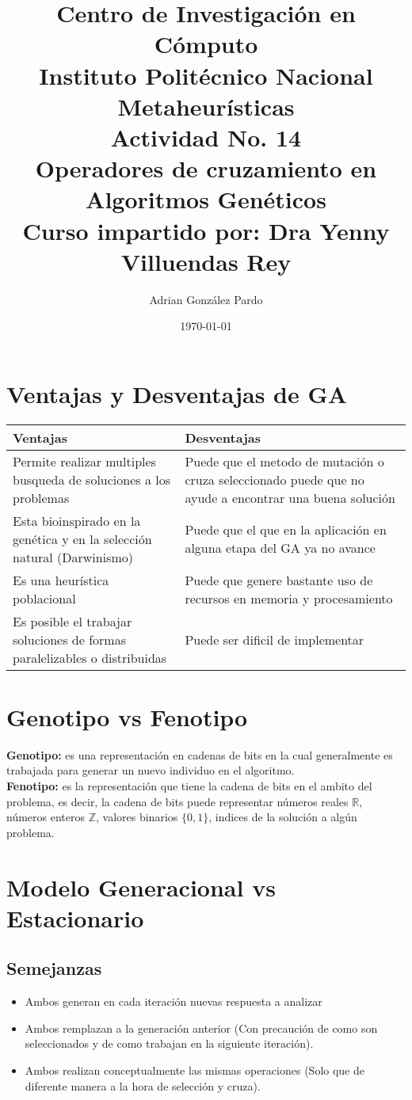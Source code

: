 \documentclass[10pt]{article}
\title{Centro de Investigación en Cómputo\\Instituto Politécnico Nacional\\Metaheurísticas\\Actividad No. 14\\ Operadores de cruzamiento en Algoritmos Genéticos\\Curso impartido por: Dra Yenny Villuendas Rey}
\author{Adrian González Pardo}
\date{\today}
\begin{document}
\maketitle
\section{Ventajas y Desventajas de GA}
\begin{center}
  \begin{tabular}{|p{6cm}|p{6cm}|}
    \hline
    Ventajas & Desventajas \\
    \hline
    Permite realizar multiples busqueda de soluciones a los problemas & Puede que el metodo de mutación o cruza seleccionado puede que no ayude a encontrar una buena solución\\
    \hline
    Esta bioinspirado en la genética y en la selección natural (Darwinismo) & Puede que el que en la aplicación en alguna etapa del GA ya no avance \\
    \hline
    Es una heurística poblacional & Puede que genere bastante uso de recursos en memoria y procesamiento \\
    \hline
    Es posible el trabajar soluciones de formas paralelizables o distribuidas&Puede ser dificil de implementar\\
    \hline
  \end{tabular}
\end{center}
\section{Genotipo vs Fenotipo}
\textbf{Genotipo:} es una representación en cadenas de bits en la cual generalmente es trabajada para generar un nuevo individuo en el algoritmo.
\\
\textbf{Fenotipo:} es la representación que tiene la cadena de bits en el ambito del problema, es decir, la cadena de bits puede representar números reales $\mathbb{R}$, números enteros $\mathbb{Z}$, valores binarios $\{0,1\}$, indices de la solución a algún problema.
\section{Modelo Generacional vs Estacionario}
\subsection{Semejanzas}
\begin{itemize}
  \item Ambos generan en cada iteración nuevas respuesta a analizar
  \item Ambos remplazan a la generación anterior (Con precaución de como son seleccionados y de como trabajan en la siguiente iteración).
  \item Ambos realizan conceptualmente las mismas operaciones (Solo que de diferente manera a la hora de selección y cruza).
\end{itemize}
\end{document}
